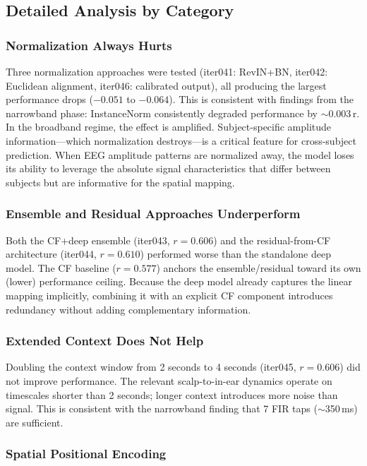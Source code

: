 \documentclass[11pt,a4paper]{article}
\begin{document}
\subsection{Detailed Analysis by Category}

\subsubsection{Normalization Always Hurts}

Three normalization approaches were tested (iter041: RevIN+BN, iter042:
Euclidean alignment, iter046: calibrated output), all producing the
largest performance drops ($-0.051$ to $-0.064$). This is consistent
with findings from the narrowband phase: InstanceNorm consistently
degraded performance by $\sim$0.003\,r. In the broadband regime, the
effect is amplified. Subject-specific amplitude information---which
normalization destroys---is a critical feature for cross-subject
prediction. When EEG amplitude patterns are normalized away, the model
loses its ability to leverage the absolute signal characteristics that
differ between subjects but are informative for the spatial mapping.

\subsubsection{Ensemble and Residual Approaches Underperform}

Both the CF+deep ensemble (iter043, $r=0.606$) and the residual-from-CF
architecture (iter044, $r=0.610$) performed worse than the standalone
deep model. The CF baseline ($r=0.577$) anchors the ensemble/residual
toward its own (lower) performance ceiling. Because the deep model
already captures the linear mapping implicitly, combining it with an
explicit CF component introduces redundancy without adding complementary
information.

\subsubsection{Extended Context Does Not Help}

Doubling the context window from 2 seconds to 4 seconds (iter045,
$r=0.606$) did not improve performance. The relevant scalp-to-in-ear
dynamics operate on timescales shorter than 2 seconds; longer context
introduces more noise than signal. This is consistent with the
narrowband finding that 7 FIR taps ($\sim$350\,ms) are sufficient.

\subsubsection{Spatial Positional Encoding}
\end{document}
